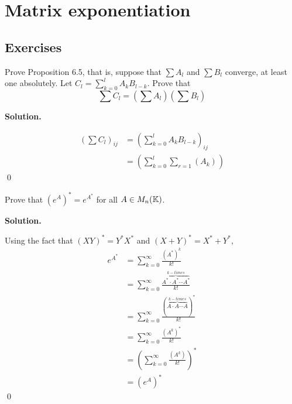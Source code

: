 \documentclass[12pt]{book}
\theoremstyle{definition}
\newenvironment{solution}
{%
  \par\noindent\textbf{Solution.}\quad
}
{%
  \qed\par
}
\begin{document}
\chapter{Matrix exponentiation}
\section{Exercises}

\begin{taggedexercise}[\textcolor{yellow}{WIP}]
Prove Proposition 6.5, that is, suppose that $\sum A_l$ and $\sum B_l$ converge, at least one absolutely.
Let $C_l = \sum_{k=0}^l A_kB_{l-k}$. Prove that
\[
\sum C_l = (\sum A_l)(\sum B_l)
\]
\end{taggedexercise}

\begin{solution}
\[
\begin{aligned}
  (\sum C_l)_{ij} &= (\sum_{k=0}^l A_kB_{l-k})_{ij} \\
                  &= (\sum_{k=0}^l \sum_{r=1}(A_k)_{})
\end{aligned}
\]
\end{solution}

\begin{taggedexercise}[\textcolor{green}{Complete}]
  Prove that $(e^A)^* = e^{A^*}$ for all $A \in M_n(\mathbb{K})$.
\end{taggedexercise}

\begin{solution}
  Using the fact that $(XY)^* = Y^*X^*$ and $(X + Y)^* = X^* + Y^*$,
  \[
  \begin{aligned}
    e^{A^*} &= \sum_{k = 0}^\infty \frac{(A^*)^k}{k!} \\
            &= \sum_{k = 0}^\infty \frac{\overbrace{A^* \cdot A^* \cdots A^*}^{k-times}}{k!} \\
            &= \sum_{k = 0}^\infty \frac{(\overbrace{A \cdot A \cdots A}^{k-times})^*}{k!} \\
            &= \sum_{k = 0}^\infty \frac{(A^k)^*}{k!} \\
            &= \left(\sum_{k = 0}^\infty \frac{(A^k)}{k!}\right)^* \\
            &= (e^A)^*
  \end{aligned}
  \]
\end{solution}
\end{document}
